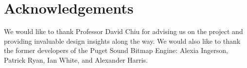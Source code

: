 \section{Acknowledgements}
We would like to thank Professor David Chiu for advising us on the project and
providing invaluable design insights along the way.
We would also like to thank the former developers of the Puget Sound Bitmap
Engine: Alexia Ingerson, Patrick Ryan, Ian White, and Alexander Harris.
